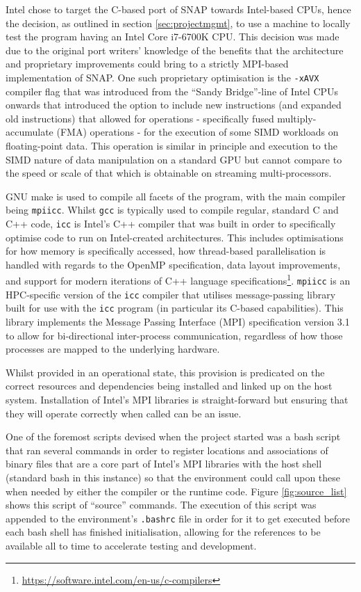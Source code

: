 \documentclass[conference]{IEEEtran}
\begin{document}
Intel chose to target the C-based port of SNAP towards Intel-based CPUs, hence the decision, as outlined in section \ref{sec:projectmgmt}, to use a machine to locally test the program having an Intel Core i7-6700K CPU. This decision was made due to the original port writers' knowledge of the benefits that the architecture and proprietary improvements could bring to a strictly MPI-based implementation of SNAP. One such proprietary optimisation is the \texttt{-xAVX} compiler flag that was introduced from the ``Sandy Bridge''-line of Intel CPUs onwards that introduced the option to include new instructions (and expanded old instructions) that allowed for operations - specifically fused multiply-accumulate (FMA) operations - for the execution of some SIMD workloads on floating-point data\cite{KanterIntel}. This operation is similar in principle and execution to the SIMD nature of data manipulation on a standard GPU but cannot compare to the speed or scale of that which is obtainable on streaming multi-processors.

GNU make is used to compile all facets of the program, with the main compiler being \texttt{mpiicc}. Whilst \texttt{gcc} is typically used to compile regular, standard C and C++ code, \texttt{icc} is Intel's C++ compiler that was built in order to specifically optimise code to run on Intel-created architectures. This includes optimisations for how memory is specifically accessed, how thread-based parallelisation is handled with regards to the OpenMP specification, data layout improvements, and support for modern iterations of C++ language specifications\footnote{\url{https://software.intel.com/en-us/c-compilers}}. \texttt{mpiicc} is an HPC-specific version of the \texttt{icc} compiler that utilises message-passing library built for use with the \texttt{icc} program (in particular its C-based capabilities). This library implements the Message Passing Interface (MPI) specification version 3.1\cite{intel-mpi-ref} to allow for bi-directional inter-process communication, regardless of how those processes are mapped to the underlying hardware.

Whilst provided in an operational state, this provision is predicated on the correct resources and dependencies being installed and linked up on the host system. Installation of Intel's MPI libraries is straight-forward but ensuring that they will operate correctly when called can be an issue.

One of the foremost scripts devised when the project started was a bash script that ran several commands in order to register locations and associations of binary files that are a core part of Intel's MPI libraries with the host shell (standard bash in this instance) so that the environment could call upon these when needed by either the compiler or the runtime code. Figure \ref{fig:source_list} shows this script of ``source'' commands. The execution of this script was appended to the environment's \texttt{.bashrc} file in order for it to get executed before each bash shell has finished initialisation, allowing for the references to be available all to time to accelerate testing and development.
\end{document}
